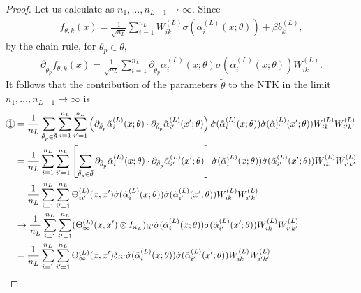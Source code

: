 \documentclass[10pt]{article}
\newcommand*\circled[1]{\tikz[baseline=(char.base)]{\node[shape=circle,draw,inner sep=0.5pt] (char) {#1};}}
\newcommand{\paran}[1]{{( #1 )}}
\begin{document}
\begin{proof}
Let us calculate \circled{1} as $n_1, \ldots, n_{L + 1} \rightarrow \infty$. Since
\begin{align*}
f_{\theta,k}(x) = \frac{1}{\sqrt{n_L}} \sum_{i = 1}^{n_L} W_{ik}^\paran{L} \sigma(\tilde{\alpha}^\paran{L}_i(x;\theta)) + \beta b^\paran{L}_k,
\end{align*}
by the chain rule, for $\tilde{\theta}_p \in \tilde{\theta}$,
\begin{align*}
\partial_{\tilde{\theta}_p} f_{\theta,k}(x) = \frac{1}{\sqrt{n_L}} \sum_{i = 1}^{n_L} \partial_{\tilde{\theta}_p} \tilde{\alpha}^\paran{L}_i(x;\theta) \dot{\sigma}(\tilde{\alpha}^\paran{L}_i(x;\theta)) W_{ik}^\paran{L}.
\end{align*}
It follows that the contribution of the parameters $\tilde{\theta}$ to the NTK in the limit $n_1, \ldots, n_{L - 1} \rightarrow \infty$ is
\begin{align*}
\circled{1} &= \frac{1}{n_L} \sum_{\tilde{\theta}_p \in \tilde{\theta}} \sum_{i = 1}^{n_L} \sum_{i' = 1}^{n_L} \left( \partial_{\tilde{\theta}_p} \tilde{\alpha}^\paran{L}_i(x;\theta) \cdot \partial_{\tilde{\theta}_p} \tilde{\alpha}^\paran{L}_{i'}(x';\theta) \right) \dot{\sigma}(\tilde{\alpha}^\paran{L}_i(x;\theta)) \dot{\sigma}(\tilde{\alpha}^\paran{L}_{i'}(x';\theta)) W^\paran{L}_{ik} W^\paran{L}_{i'k'} \\
&= \frac{1}{n_L} \sum_{i = 1}^{n_L} \sum_{i' = 1}^{n_L} \left[ \sum_{\tilde{\theta}_p \in \tilde{\theta}} \partial_{\tilde{\theta}_p} \tilde{\alpha}^\paran{L}_i(x;\theta) \cdot \partial_{\tilde{\theta}_p} \tilde{\alpha}^\paran{L}_{i'}(x';\theta) \right] \dot{\sigma}(\tilde{\alpha}^\paran{L}_i(x;\theta)) \dot{\sigma}(\tilde{\alpha}^\paran{L}_{i'}(x';\theta)) W^\paran{L}_{ik} W^\paran{L}_{i'k'} \\
&= \frac{1}{n_L} \sum_{i = 1}^{n_L} \sum_{i' = 1}^{n_L} \Theta^\paran{L}_{ii'}(x,x') \dot{\sigma}(\tilde{\alpha}^\paran{L}_i(x;\theta)) \dot{\sigma}(\tilde{\alpha}^\paran{L}_{i'}(x';\theta)) W^\paran{L}_{ik} W^\paran{L}_{i'k'} \\
&\rightarrow \frac{1}{n_L} \sum_{i = 1}^{n_L} \sum_{i' = 1}^{n_L} (\Theta^\paran{L}_\infty(x,x') \otimes I_{n_L})_{ii'} \dot{\sigma}(\tilde{\alpha}^\paran{L}_i(x;\theta)) \dot{\sigma}(\tilde{\alpha}^\paran{L}_{i'}(x';\theta)) W^\paran{L}_{ik} W^\paran{L}_{i'k'} \\
&= \frac{1}{n_L} \sum_{i = 1}^{n_L} \sum_{i' = 1}^{n_L} \Theta^\paran{L}_\infty(x,x') \delta_{ii'} \dot{\sigma}(\tilde{\alpha}^\paran{L}_i(x;\theta)) \dot{\sigma}(\tilde{\alpha}^\paran{L}_{i'}(x';\theta)) W^\paran{L}_{ik} W^\paran{L}_{i'k'} \\

\end{align*}
\end{proof}
\end{document}
